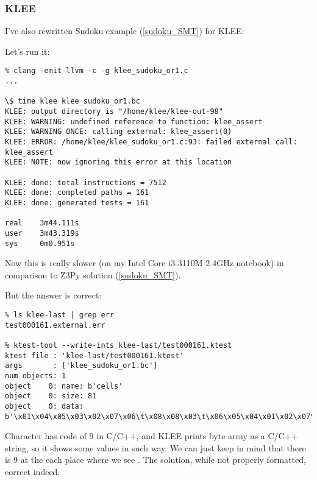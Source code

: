 \subsubsection{KLEE}

I've also rewritten Sudoku example (\ref{sudoku_SMT}) for KLEE:



Let's run it:

\begin{lstlisting}
% clang -emit-llvm -c -g klee_sudoku_or1.c
...

\$ time klee klee_sudoku_or1.bc
KLEE: output directory is "/home/klee/klee-out-98"
KLEE: WARNING: undefined reference to function: klee_assert
KLEE: WARNING ONCE: calling external: klee_assert(0)
KLEE: ERROR: /home/klee/klee_sudoku_or1.c:93: failed external call: klee_assert
KLEE: NOTE: now ignoring this error at this location

KLEE: done: total instructions = 7512
KLEE: done: completed paths = 161
KLEE: done: generated tests = 161

real    3m44.111s
user    3m43.319s
sys     0m0.951s
\end{lstlisting}

Now this is really slower (on my Intel Core i3-3110M 2.4GHz notebook) in comparison to Z3Py solution (\ref{sudoku_SMT}).

But the answer is correct:

\begin{lstlisting}
% ls klee-last | grep err
test000161.external.err

% ktest-tool --write-ints klee-last/test000161.ktest
ktest file : 'klee-last/test000161.ktest'
args       : ['klee_sudoku_or1.bc']
num objects: 1
object    0: name: b'cells'
object    0: size: 81
object    0: data: b'\x01\x04\x05\x03\x02\x07\x06\t\x08\x08\x03\t\x06\x05\x04\x01\x02\x07\x06\x07\x02\t\x01\x08\x05\x04\x03\x04\t\x06\x01\x08\x05\x03\x07\x02\x02\x01\x08\x04\x07\x03\t\x05\x06\x07\x05\x03\x02\t\x06\x04\x08\x01\x03\x06\x07\x05\x04\x02\x08\x01\t\t\x08\x04\x07\x06\x01\x02\x03\x05\x05\x02\x01\x08\x03\t\x07\x06\x04'
\end{lstlisting}

Character  has code of 9 in C/C++,
and KLEE prints byte array as a C/C++ string, so it shows some values in such way.
We can just keep in mind that there is 9 at the each place where we see .
The solution, while not properly formatted, correct indeed.

